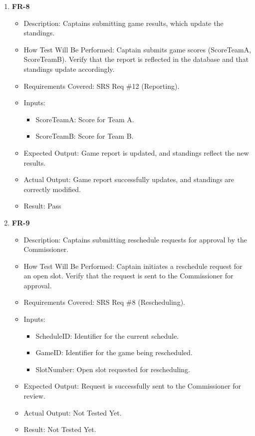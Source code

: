 \documentclass[12pt, titlepage]{article}
\begin{document}
\begin{enumerate}
    \item \textbf{FR-8}  
      \begin{itemize}
          \item Description: Captains submitting game results, which update the standings.
          \item How Test Will Be Performed: Captain submits game scores (ScoreTeamA, ScoreTeamB). Verify that the report is reflected in the database and that standings update accordingly.
          \item Requirements Covered: SRS Req \#12 (Reporting).
          \item Inputs:  
              \begin{itemize} 
                  \item ScoreTeamA: Score for Team A.  
                  \item ScoreTeamB: Score for Team B.  
              \end{itemize}
          \item Expected Output: Game report is updated, and standings reflect the new results.
          \item Actual Output: Game report successfully updates, and standings are correctly modified.
          \item Result: Pass
      \end{itemize}

      \item \textbf{FR-9}  
      \begin{itemize}
          \item Description: Captains submitting reschedule requests for approval by the Commissioner.
          \item How Test Will Be Performed: Captain initiates a reschedule request for an open slot. Verify that the request is sent to the Commissioner for approval.
          \item Requirements Covered: SRS Req \#8 (Rescheduling).
          \item Inputs:  
              \begin{itemize}
                  \item ScheduleID: Identifier for the current schedule.  
                  \item GameID: Identifier for the game being rescheduled.  
                  \item SlotNumber: Open slot requested for rescheduling.  
              \end{itemize}
          \item Expected Output: Request is successfully sent to the Commissioner for review.
          \item Actual Output: Not Tested Yet.
          \item Result: Not Tested Yet.
      \end{itemize}


\end{enumerate}
\end{document}
